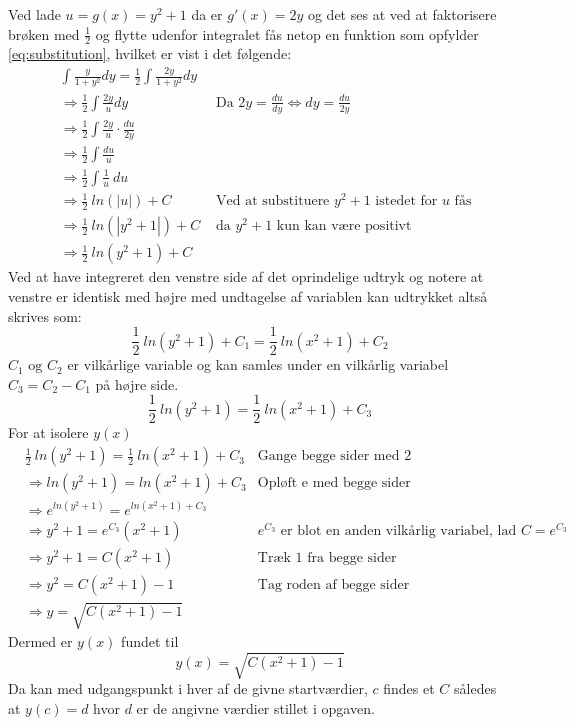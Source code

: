 \documentclass[11pt, fleqn]{article}
\begin{document}
Ved lade $u=g(x)=y^2+1$ da er $g'(x)=2y$ og det ses at ved at faktorisere brøken med $\frac{1}{2}$ og flytte udenfor integralet fås netop en funktion som opfylder \eqref{eq:substitution}, hvilket er vist i det følgende:
\begin{align*}
&\int \frac{y}{1+y^2}dy= \frac{1}{2} \int \frac{2y}{1+y^2}dy \\
& \Rightarrow \frac{1}{2} \int \frac{2y}{u}dy & \text{ Da } 2y=\frac{du}{dy} \Leftrightarrow dy=\frac{du}{2y} \\
& \Rightarrow \frac{1}{2} \int \frac{2y}{u}\cdot \frac{du}{2y}   \\ 
& \Rightarrow \frac{1}{2} \int \frac{du}{u} \\
& \Rightarrow \frac{1}{2} \int \frac{1}{u}\ du\\
& \Rightarrow \frac{1}{2}\ ln(|u|) + C & \text{ Ved at substituere } y^2+1 \text{ istedet for } u \text{ fås}\\
& \Rightarrow \frac{1}{2}\ ln(|y^2+1|) + C  & \text{ da } y^2+1 \text{ kun kan være positivt}\\
& \Rightarrow  \frac{1}{2}\ ln(y^2+1) + C
\end{align*}
Ved at have integreret den venstre side af det oprindelige udtryk og notere at venstre er identisk med højre med undtagelse af variablen kan udtrykket altså skrives som:
\[
\frac{1}{2}\ ln(y^2+1) + C_1 = \frac{1}{2}\ ln(x^2+1) + C_2
\]
$C_1 \text{ og } C_2$ er vilkårlige variable og kan samles  under en vilkårlig variabel $C_3=C_2-C_1$ på højre side.
\[
\frac{1}{2}\ ln(y^2+1) = \frac{1}{2}\ ln(x^2+1) + C_3
\]
For at isolere $y(x)$ 
\begin{align*}
&\frac{1}{2}\ ln(y^2+1) = \frac{1}{2}\ ln(x^2+1) + C_3 & \text{Gange begge sider med } 2\\
& \Rightarrow ln(y^2+1) = ln(x^2+1) + C_3 & \text{Opløft e med begge sider} \\
& \Rightarrow e^{ln(y^2+1)} = e^{ln(x^2+1)+C_3} \\
& \Rightarrow y^2+1=e^{C_3}(x^2+1)	& e^{C_3}\text{ er blot en anden vilkårlig variabel, lad } C=e^{C_3}\\
& \Rightarrow y^2+1=C(x^2+1) & \text{Træk $1$ fra begge sider} \\
& \Rightarrow y^2 = C(x^2+1)-1 & \text{Tag roden af begge sider} \\
& \Rightarrow y = \sqrt{C(x^2+1)-1}
\end{align*}
Dermed er $y(x)$ fundet til
\[
y(x) = \sqrt{C(x^2+1)-1}
\]
Da kan med udgangspunkt i hver af de givne startværdier, $c$ findes et $C$ således at $y(c)=d$ hvor $d$ er de angivne værdier stillet i opgaven. \\
\end{document}
